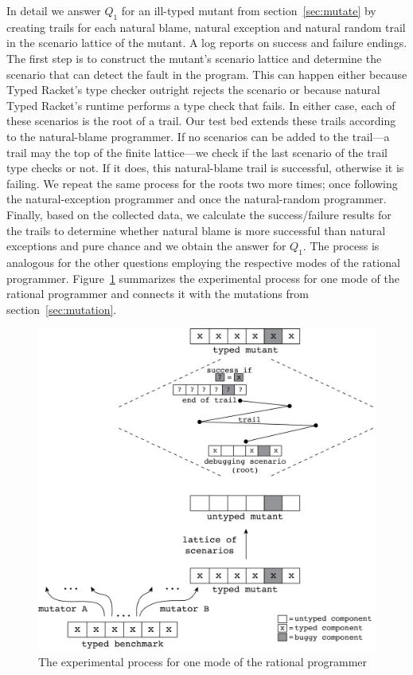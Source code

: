 
In detail we answer $Q_1$ for an ill-typed mutant from
section~\ref{sec:mutate} by creating trails for each natural blame,
natural exception and natural random trail in the scenario lattice of the mutant. A
log reports on success and failure endings.  The first step is to construct the
mutant's scenario lattice and determine the scenario that can detect the fault in
the program. This can happen either because Typed Racket's type checker outright
rejects the scenario or because natural Typed Racket's runtime performs a type check
that fails. In either case, each of these scenarios is the root of a trail. Our test
bed extends these trails according to the natural-blame programmer.  If no scenarios
can be added to the trail---a trail may the top of the finite lattice---we check if
the last scenario of the trail type checks or not. If it does, this natural-blame
trail is successful, otherwise it is failing. We repeat the same process for the
roots two more times; once following the natural-exception programmer and once the
natural-random programmer. Finally, based on the collected data, we calculate the
success/failure results for the trails to determine whether natural blame is more
successful than natural exceptions and pure chance and we obtain the answer for
$Q_1$.  The process is analogous for the other questions employing the respective
modes of the rational programmer. Figure~\ref{fig:process} summarizes the
experimental process for one mode of the rational programmer and connects
it with the mutations from section~\ref{sec:mutation}.

\begin{figure}
  \centering
  \includegraphics[width=\textwidth]{./Images/process}
  \caption{The experimental process for one mode of the rational
  programmer}
  \label{fig:process}
\end{figure}


